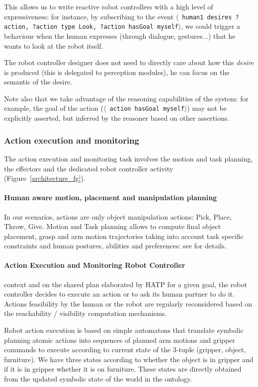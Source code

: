 \documentclass[preprint,12pt]{elsarticle}
\newcommand{\stmt}[1]{{\footnotesize \tt $\langle$ #1\relax$\rangle$}}
\begin{document}
This allows us to write reactive robot controllers with a high level of
expressiveness: for instance, by subscribing to the event \stmt{human1 desires
?action, ?action type Look, ?action hasGoal myself}, we could trigger a
behaviour when the human expresses (through dialogue, gestures...) that he
wants to look at the robot itself.

The robot controller designer does not need to directly care about how this
\emph{desire} is produced (this is delegated to perception modules), he can
focus on the semantic of the desire.

Note also that we take advantage of the reasoning capabilities of the system:
for example, the goal of the action (\stmt{action hasGoal myself}) may not be
explicitly asserted, but inferred by the reasoner based on other assertions.

\subsubsection{Action execution and monitoring}\label{sec:action}

The action execution and monitoring task involves the motion and task
planning, the effectors and the dedicated robot controller activity
(Figure~\ref{architecture_fg}).


\paragraph{Human aware motion, placement and manipulation planning}
In our scenarios, actions are only object manipulation actions: Pick,
Place, Throw, Give. Motion and Task planning allows to compute final
object placement, grasp and arm motion trajectories taking into
account task specific constraints and human postures, abilities and
preferences: see \cite{Sisbot2008, Mainprice2011, Pandey2010} for
details.


\paragraph{Action Execution and Monitoring Robot Controller}
context and on the shared plan elaborated by HATP for a given goal,
the robot controller decides to execute an action or to ask its human
partner to do it.  Actions feasibility by the human or the robot are
regularly reconsidered based on the reachability / visibility
computation mechanisms.

Robot action execution is based on simple automatons  that translate
symbolic planning atomic actions into sequences of planned arm motions
and gripper commands to execute according to current state
of the 3-tuple (gripper, object, furniture). We have three states
according to whether the object is in gripper and if it is in gripper
whether it is on furniture.  These states are directly obtained from
the updated symbolic state of the world in the ontology.
\end{document}
